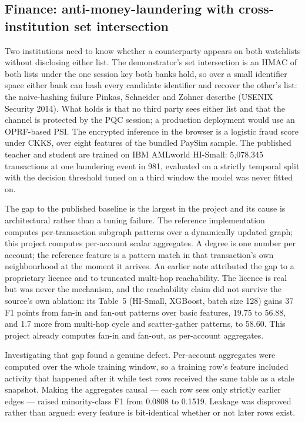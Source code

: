 \documentclass[11pt,a4paper]{article}
\begin{document}
\subsection{Finance: anti-money-laundering with cross-institution set intersection}
Two institutions need to know whether a counterparty appears on both watchlists without disclosing
either list. The demonstrator's set intersection is an HMAC of both lists under the one session key
both banks hold, so over a small identifier space either bank can hash every candidate identifier and
recover the other's list: the naive-hashing failure Pinkas, Schneider and Zohner describe (USENIX
Security 2014). What holds is that no third party sees either list and that the channel is protected
by the PQC session; a production deployment would use an OPRF-based PSI. The encrypted inference in
the browser is a logistic fraud score under CKKS, over eight features of the bundled PaySim sample.
The published teacher and student are trained on IBM AMLworld HI-Small: 5{,}078{,}345 transactions at
one laundering event in 981, evaluated on a strictly temporal split with the decision threshold tuned
on a third window the model was never fitted on.

The gap to the published baseline is the largest in the project and its cause is architectural
rather than a tuning failure. The reference implementation computes per-transaction subgraph
patterns over a dynamically updated graph; this project computes per-account scalar aggregates. A
degree is one number per account; the reference feature is a pattern match in that transaction's own
neighbourhood at the moment it arrives. An earlier note attributed the gap to a proprietary licence
and to truncated multi-hop reachability. The licence is real but was never the mechanism, and the
reachability claim did not survive the source's own ablation: its Table~5 (HI-Small, XGBoost, batch
size 128) gains 37 F1 points from fan-in and fan-out patterns over basic features, 19.75 to 56.88,
and 1.7 more from multi-hop cycle and scatter-gather patterns, to 58.60. This project already
computes fan-in and fan-out, as per-account aggregates.

Investigating that gap found a genuine defect. Per-account aggregates were computed over the whole
training window, so a training row's feature included activity that happened after it while test
rows received the same table as a stale snapshot. Making the aggregates causal --- each row sees only
strictly earlier edges --- raised minority-class F1 from 0.0808 to 0.1519. Leakage was disproved
rather than argued: every feature is bit-identical whether or not later rows exist.
\end{document}
